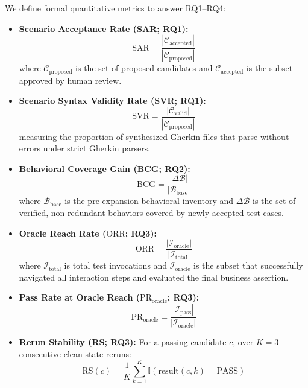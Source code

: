 \documentclass[pdflatex,sn-mathphys-num]{sn-jnl}
\begin{document}
We define formal quantitative metrics to answer RQ1--RQ4:
\begin{itemize}
    \item \textbf{Scenario Acceptance Rate (SAR; RQ1):}
    \begin{equation}
        \text{SAR} = \frac{|\mathcal{C}_{\text{accepted}}|}{|\mathcal{C}_{\text{proposed}}|}
    \end{equation}
    where $\mathcal{C}_{\text{proposed}}$ is the set of proposed candidates and $\mathcal{C}_{\text{accepted}}$ is the subset approved by human review.
    \item \textbf{Scenario Syntax Validity Rate (SVR; RQ1):}
    \begin{equation}
        \text{SVR} = \frac{|\mathcal{C}_{\text{valid}}|}{| \mathcal{C}_{\text{proposed}} |}
    \end{equation}
    measuring the proportion of synthesized Gherkin files that parse without errors under strict Gherkin parsers.
    \item \textbf{Behavioral Coverage Gain (BCG; RQ2):}
    \begin{equation}
        \text{BCG} = \frac{|\Delta \mathcal{B}|}{|\mathcal{B}_{\text{base}}|}
    \end{equation}
    where $\mathcal{B}_{\text{base}}$ is the pre-expansion behavioral inventory and $\Delta \mathcal{B}$ is the set of verified, non-redundant behaviors covered by newly accepted test cases.
    \item \textbf{Oracle Reach Rate ($\text{ORR}$; RQ3):}
    \begin{equation}
        \text{ORR} = \frac{|\mathcal{I}_{\text{oracle}}|}{|\mathcal{I}_{\text{total}}|}
    \end{equation}
    where $\mathcal{I}_{\text{total}}$ is total test invocations and $\mathcal{I}_{\text{oracle}}$ is the subset that successfully navigated all interaction steps and evaluated the final business assertion.
    \item \textbf{Pass Rate at Oracle Reach ($\text{PR}_{\text{oracle}}$; RQ3):}
    \begin{equation}
        \text{PR}_{\text{oracle}} = \frac{|\mathcal{I}_{\text{pass}}|}{|\mathcal{I}_{\text{oracle}}|}
    \end{equation}
    \item \textbf{Rerun Stability (RS; RQ3):} For a passing candidate $c$, over $K=3$ consecutive clean-state reruns:
    \begin{equation}
        \text{RS}(c) = \frac{1}{K} \sum_{k=1}^K \mathbb{I}(\text{result}(c, k) = \text{PASS})

\end{equation}
\end{itemize}
\end{document}
